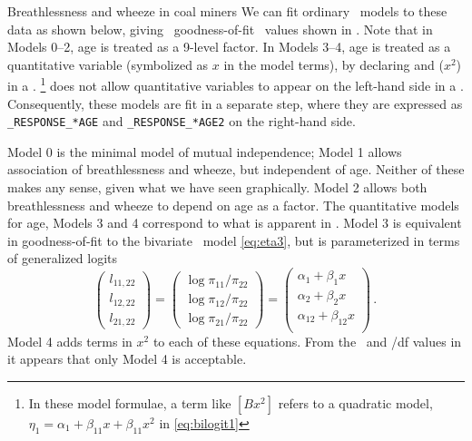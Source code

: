 \begin{Example}[ashford]{Breathlessness and wheeze in coal miners}
We can fit ordinary \loglin\ models to these data as shown below,
giving \LR\ goodness-of-fit \GSQ\ values shown in .
Note that in Models 0--2, age is treated as a 9-level factor.
In Models 3--4, age is treated as a quantitative variable
(symbolized as $x$ in the model terms), by declaring
 and  ($x^2$) in a .%
\footnote{In these model formulae, a term like $[Bx^2]$
refers to a quadratic model, $\eta_1 = \alpha_1 + \beta_{11} x + \beta_{11} x^2$ in \eqref{eq:bilogit1}}
 does not allow quantitative variables to appear
on the left-hand side in a .
Consequently, these models are fit in a separate 
step, where they are expressed as \verb|_RESPONSE_*AGE| and
\verb|_RESPONSE_*AGE2| on the right-hand side.



Model 0 is the minimal model of mutual independence; Model 1 allows
association of breathlessness and wheeze, but independent of age.
Neither of these makes any sense, given what we have seen graphically.
Model 2 allows both breathlessness and wheeze to depend on age as a factor.
The quantitative models for age, Models 3 and 4
correspond to what is apparent in .
Model 3 is equivalent in goodness-of-fit
to the bivariate \loglin\ model \eqref{eq:eta3},
but is parameterized in terms of generalized logits
\begin{equation*}
\left(
\begin{array}{c}
l _{11,22} \\
l _{12,22} \\
l _{21,22}
\end{array}
\right) =
\left(
\begin{array}{c}
\log \pi_{11} / \pi_{22} \\
\log \pi_{12} / \pi_{22} \\
\log \pi_{21} / \pi_{22}
\end{array}
\right) =
\left(
\begin{array}{c}
\alpha _1+\beta _1 x \\
\alpha _2+\beta _2 x \\
\alpha _{12}+\beta _{12} x \\
\end{array}
\right)   %
\period
\end{equation*}
Model 4 adds terms in $x^2$ to each of these equations.
From the \GSQ\  and \GSQ/df values in  it appears that
only Model 4 is acceptable.


\end{Example}
